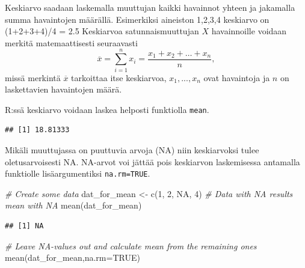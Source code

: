 \documentclass[
]{book}
\newenvironment{Shaded}{\begin{snugshade}}{\end{snugshade}}
\newcommand{\AttributeTok}[1]{\textcolor[rgb]{0.77,0.63,0.00}{#1}}
\newcommand{\CommentTok}[1]{\textcolor[rgb]{0.56,0.35,0.01}{\textit{#1}}}
\newcommand{\ConstantTok}[1]{\textcolor[rgb]{0.00,0.00,0.00}{#1}}
\newcommand{\DecValTok}[1]{\textcolor[rgb]{0.00,0.00,0.81}{#1}}
\newcommand{\FunctionTok}[1]{\textcolor[rgb]{0.00,0.00,0.00}{#1}}
\newcommand{\NormalTok}[1]{#1}
\newcommand{\OtherTok}[1]{\textcolor[rgb]{0.56,0.35,0.01}{#1}}
\newcommand{\SpecialCharTok}[1]{\textcolor[rgb]{0.00,0.00,0.00}{#1}}
\begin{document}
Keskiarvo saadaan laskemalla muuttujan kaikki havainnot yhteen ja jakamalla summa havaintojen määrällä. Esimerkiksi aineiston 1,2,3,4 keskiarvo on (1+2+3+4)/4 = 2.5 Keskiarvoa satunnaismuuttujan \(X\) havainnoille voidaan merkitä matemaattisesti seuraavasti
\[\overline{x} = \sum_{i=1}^n x_i = \frac{x_1+x_2+\dots+x_n}{n},\]
missä merkintä \(\overline{x}\) tarkoittaa itse keskiarvoa, \(x_1,...,x_n\) ovat havaintoja ja \(n\) on laskettavien havaintojen määrä.

R:ssä keskiarvo voidaan laskea helposti funktiolla \texttt{mean}.

\begin{Shaded}
\end{Shaded}

\begin{verbatim}
## [1] 18.81333
\end{verbatim}

Mikäli muuttujassa on puuttuvia arvoja (NA) niin keskiarvoksi tulee oletusarvoisesti NA. NA-arvot voi jättää pois keskiarvon laskemisessa antamalla funktiolle lisäargumentiksi \texttt{na.rm=TRUE}.

\begin{Shaded}
\begin{Highlighting}[]
\CommentTok{\# Create some data}
\NormalTok{dat\_for\_mean }\OtherTok{\textless{}{-}} \FunctionTok{c}\NormalTok{(}\DecValTok{1}\NormalTok{, }\DecValTok{2}\NormalTok{, }\ConstantTok{NA}\NormalTok{, }\DecValTok{4}\NormalTok{)}
\CommentTok{\# Data with NA results mean with NA}
\FunctionTok{mean}\NormalTok{(dat\_for\_mean)}
\end{Highlighting}
\end{Shaded}

\begin{verbatim}
## [1] NA
\end{verbatim}

\begin{Shaded}
\begin{Highlighting}[]
\CommentTok{\# Leave NA{-}values out and calculate mean from the remaining ones}
\FunctionTok{mean}\NormalTok{(dat\_for\_mean,}\AttributeTok{na.rm=}\ConstantTok{TRUE}\NormalTok{)}
\end{Highlighting}
\end{Shaded}
\end{document}
